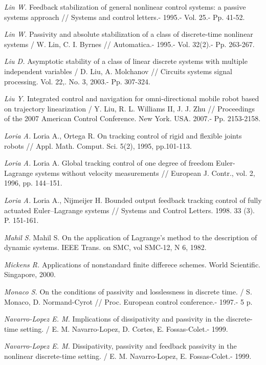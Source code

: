 \begin{thebibliography}{10}
	{\it Lin W.} Feedback stabilization of general nonlinear control systems: a passive systems approach // Systems and control letters.- 1995.- Vol. 25.- Pp. 41-52.
	
	{\it Lin W.} Passivity and absolute stabilization of a class of discrete-time nonlinear systems / W. Lin, C. I. Byrnes // Automatica.- 1995.- Vol. 32(2).- Pp. 263-267.
	
	{\it Liu D.} Asymptotic stability of a class of linear discrete systems with multiple independent variables / D. Liu, A. Molchanov // Circuits systems signal processing. Vol. 22,. No. 3, 2003.- Pp. 307-324.
	
	{\it Liu Y.} Integrated control and navigation for omni-directional mobile robot based on trajectory linearization / Y. Liu, R. L. Williams II, J. J. Zhu // Proceedings of the 2007 American Control Conference. New York. USA. 2007.- Pp. 2153-2158.
	
	{\it Loria A.} Loria A., Ortega R. On tracking control of rigid and flexible joints robots // Appl. Math. Comput. Sci. 5(2), 1995, pp.101-113.
	
	{\it Loria A.} Loria A. Global tracking control of one degree of freedom Euler-Lagrange systems without velocity measurements // European J. Contr., vol. 2, 1996, pp. 144–151.
	
	{\it Loria A.} Loria A., Nijmeijer H. Bounded output feedback tracking control of fully actuated Euler–Lagrange systems // Systems and Control Letters. 1998. 33 (3). P. 151-161.
	
	{\it Mahil S.} Mahil S. On the application of Lagrange's method to the description of dynamic systems. IEEE Trans. on SMC, vol SMC-12, N 6, 1982.
	
	{\it Mickens R.} Applications of nonstandard finite differece schemes. World Scientific. Singapore, 2000.
	
	{\it Monaco S.} On the conditions of passivity and losslessness in discrete time. / S. Monaco, D. Normand-Cyrot // Proc. European control conference.- 1997.- 5 p.
	
	{\it Navarro-Lopez E. M.} Implications of dissipativity and passivity in the discrete-time setting. / E. M. Navarro-Lopez, D. Cortes, E. Fossas-Colet.- 1999.
	
	{\it Navarro-Lopez E. M.} Dissipativity, passivity and feedback passivity in the nonlinear discrete-time setting. / E. M. Navarro-Lopez, E. Fossas-Colet.- 1999.
	

\end{thebibliography}
